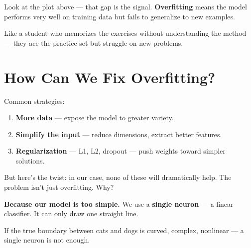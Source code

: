 \documentclass[11pt]{article}
\begin{document}
\vspace{0.5em}

\noindent Look at the plot above — that gap is the signal. \textbf{Overfitting} means the model performs very well on training data but fails to generalize to new examples.

\begin{tcolorbox}[colback=white!98!gray, colframe=gray!30!black, arc=1mm]
Like a student who memorizes the exercises without understanding the method —  
they ace the practice set but struggle on new problems.
\end{tcolorbox}

\vspace{0.5em}

\begin{center}
\end{center}

\vspace{1em}

\section*{How Can We Fix Overfitting?}

Common strategies:
\begin{enumerate}
    \item \textbf{More data} — expose the model to greater variety.
    \item \textbf{Simplify the input} — reduce dimensions, extract better features.
    \item \textbf{Regularization} — L1, L2, dropout — push weights toward simpler solutions.
\end{enumerate}

\vspace{0.5em}

But here's the twist: in our case, none of these will dramatically help. The problem isn't just overfitting. Why?

\begin{tcolorbox}[colback=white!98!gray, colframe=gray!30!black, arc=1mm]
\textbf{Because our model is too simple.}  
We use a \textbf{single neuron} — a linear classifier.  
It can only draw one straight line.
\end{tcolorbox}

\vspace{0.5em}

If the true boundary between cats and dogs is curved, complex, nonlinear —  
a single neuron is not enough.
\end{document}
